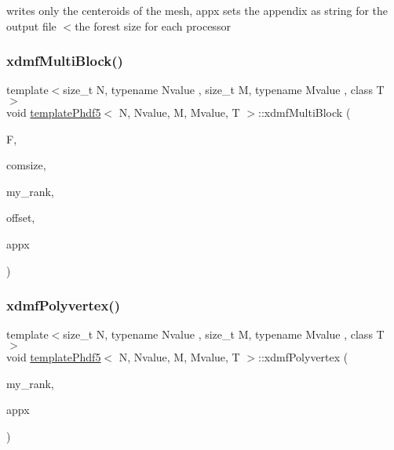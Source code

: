 writes only the centeroids of the mesh, appx sets the appendix as string for the output file $<$the forest size for each processor \mbox{\label{classtemplatePhdf5_abf49ff7a33f6c843a145cebe64ea32bc}} 
\subsubsection{\texorpdfstring{xdmf\+Multi\+Block()}{xdmfMultiBlock()}}
{\footnotesize\ttfamily template$<$size\+\_\+t N, typename Nvalue , size\+\_\+t M, typename Mvalue , class T $>$ \\
void \mbox{\hyperlink{classtemplatePhdf5}{template\+Phdf5}}$<$ N, Nvalue, M, Mvalue, T $>$\+::xdmf\+Multi\+Block (\begin{DoxyParamCaption}\item[{\mbox{\hyperlink{classTemplateForest}{Template\+Forest}}$<$ N, Nvalue, M, Mvalue, T $>$ \&}]{F,  }\item[{\mbox{\hyperlink{definitions_8h_adbd822dbdb8152553a0f77b84915bd8d}{integer}}}]{comsize,  }\item[{\mbox{\hyperlink{definitions_8h_adbd822dbdb8152553a0f77b84915bd8d}{integer}}}]{my\+\_\+rank,  }\item[{\mbox{\hyperlink{definitions_8h_a69aa29b598b851b0640aa225a9e5d61d}{uint}}}]{offset,  }\item[{\mbox{\hyperlink{definitions_8h_a69aa29b598b851b0640aa225a9e5d61d}{uint}}}]{appx }\end{DoxyParamCaption})}

\mbox{\label{classtemplatePhdf5_ac6518d18bef649156b76f4f2871801e7}} 
\subsubsection{\texorpdfstring{xdmf\+Polyvertex()}{xdmfPolyvertex()}}
{\footnotesize\ttfamily template$<$size\+\_\+t N, typename Nvalue , size\+\_\+t M, typename Mvalue , class T $>$ \\
void \mbox{\hyperlink{classtemplatePhdf5}{template\+Phdf5}}$<$ N, Nvalue, M, Mvalue, T $>$\+::xdmf\+Polyvertex (\begin{DoxyParamCaption}\item[{\mbox{\hyperlink{definitions_8h_adbd822dbdb8152553a0f77b84915bd8d}{integer}}}]{my\+\_\+rank,  }\item[{\mbox{\hyperlink{definitions_8h_a69aa29b598b851b0640aa225a9e5d61d}{uint}}}]{appx }\end{DoxyParamCaption})}



